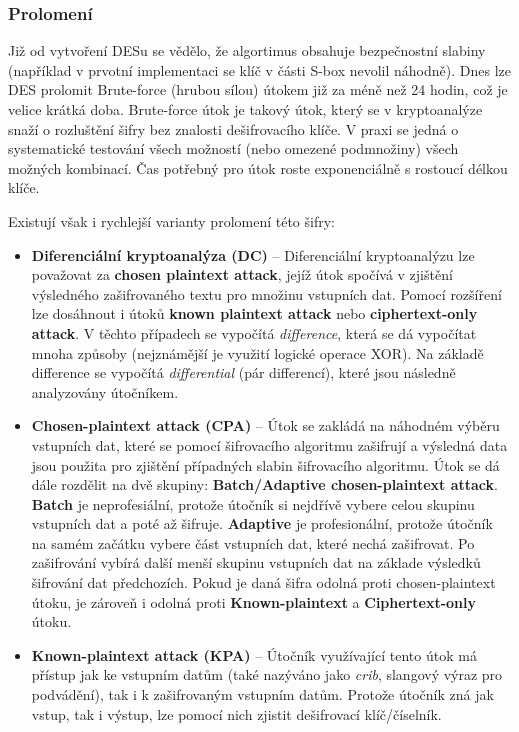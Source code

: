 \documentclass[12pt, a4paper]{article}
\begin{document}
		\subsubsection{Prolomení}
		Již od vytvoření DESu se vědělo, že algortimus obsahuje bezpečnostní slabiny (například v prvotní implementaci se klíč v části S-box nevolil náhodně). Dnes lze DES prolomit Brute-force (hrubou sílou) útokem již za méně než 24 hodin, což je velice krátká doba. Brute-force útok je takový útok, který se v kryptoanalýze snaží o rozluštění šifry bez znalosti dešifrovacího klíče. V praxi se jedná o systematické testování všech možností (nebo omezené podmnožiny) všech možných kombinací. Čas potřebný pro útok roste exponenciálně s rostoucí délkou klíče.
		\par
		Existují však i rychlejší varianty prolomení této šifry:
		\begin{itemize}
			\item \textbf{Diferenciální kryptoanalýza (DC)} -- Diferenciální kryptoanalýzu lze považovat za \textbf{chosen plaintext attack}, jejíž útok spočívá v zjištění výsledného zašifrovaného textu pro množinu vstupních dat. Pomocí rozšíření lze dosáhnout i útoků \textbf{known plaintext attack} nebo \textbf{ciphertext-only attack}. V těchto případech se vypočítá \textit{difference}, která se dá vypočítat mnoha způsoby (nejznámější je využití logické operace XOR). Na základě difference se vypočítá \textit{differential} (pár differencí), které jsou následně analyzovány útočníkem.
				\item \textbf{Chosen-plaintext attack (CPA)} -- Útok se zakládá na náhodném výběru vstupních dat, které se pomocí šifrovacího algoritmu zašifrují a výsledná data jsou použita pro zjištění případných slabin šifrovacího algoritmu. Útok se dá dále rozdělit na dvě skupiny: \textbf{Batch/Adaptive chosen-plaintext attack}. \textbf{Batch} je neprofesiální, protože útočník si nejdřívě vybere celou skupinu vstupních dat a poté až šifruje. \textbf{Adaptive} je profesionální, protože útočník na samém začátku vybere část vstupních dat, které nechá zašifrovat. Po zašifrování vybírá další menší skupinu vstupních dat na základe výsledků šifrování dat předchozích. Pokud je daná šifra odolná proti chosen-plaintext útoku, je zároveň i odolná proti \textbf{Known-plaintext} a \textbf{Ciphertext-only} útoku.
				\item \textbf{Known-plaintext attack (KPA)} -- Útočník využívající tento útok má přístup jak ke vstupním datům (také nazýváno jako \textit{crib}, slangový výraz pro podvádění), tak i k zašifrovaným vstupním datům. Protože útočník zná jak vstup, tak i výstup, lze pomocí nich zjistit dešifrovací klíč/číselník.

\end{itemize}
\end{document}
